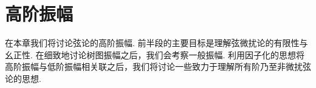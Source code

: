 
\chapter{高阶振幅} \label{cha:9}
在本章我们将讨论弦论的高阶振幅. 前半段的主要目标是理解弦微扰论的有限性与幺正性. 在细致地讨论树图振幅之后，我们会考察一般振幅. 利用因子化的思想将高阶振幅与低阶振幅相关联之后，我们将讨论一些致力于理解所有阶乃至非微扰弦论的思想.

